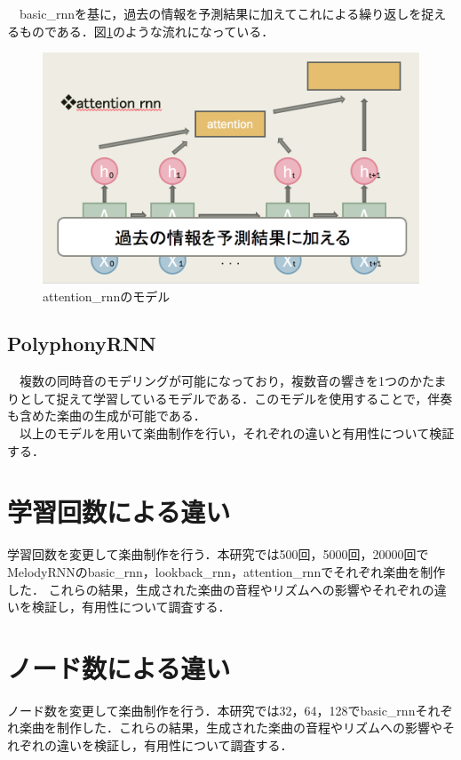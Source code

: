 　basic\_rnnを基に，過去の情報を予測結果に加えてこれによる繰り返しを捉えるものである．図\ref{fig:attentio_rnnのモデル}のような流れになっている．
\begin{figure}[!ht]
    \begin{screen}
    \begin{center}
        \includegraphics[scale=0.8,clip]{./img/attention1.png}
        \caption{attention\_rnnのモデル}
        \label{fig:attentio_rnnのモデル}
    \end{center}
    \end{screen}
\end{figure}
\subsection{PolyphonyRNN}
　複数の同時音のモデリングが可能になっており，複数音の響きを1つのかたまりとして捉えて学習しているモデルである．このモデルを使用することで，伴奏も含めた楽曲の生成が可能である．\\
　以上のモデルを用いて楽曲制作を行い，それぞれの違いと有用性について検証する．
\newpage
\section{学習回数による違い}
学習回数を変更して楽曲制作を行う．本研究では500回，5000回，20000回でMelodyRNNのbasic\_rnn，lookback\_rnn，attention\_rnnでそれぞれ楽曲を制作した．
これらの結果，生成された楽曲の音程やリズムへの影響やそれぞれの違いを検証し，有用性について調査する．
\section{ノード数による違い}
ノード数を変更して楽曲制作を行う．本研究では32，64，128でbasic\_rnnそれぞれ楽曲を制作した．これらの結果，生成された楽曲の音程やリズムへの影響やそれぞれの違いを検証し，有用性について調査する．